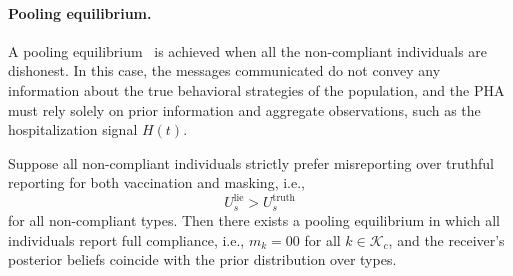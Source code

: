 \documentclass[sigconf,review]{acmart}
\begin{document}

\paragraph{Pooling equilibrium.}


A pooling equilibrium~\cite{HutteggerPNAS2014} is achieved when all the non-compliant individuals are dishonest. In this case, the messages communicated do not convey any information about the true behavioral strategies of the population, and the PHA must rely solely on prior information and aggregate observations, such as the hospitalization signal $H(t)$.

\begin{theorem}
\label{thm:pooling}
Suppose all non-compliant individuals strictly prefer misreporting over truthful reporting for both vaccination and masking, i.e.,
\[
U_s^{\text{lie}} > U_s^{\text{truth}}
\]
for all non-compliant types. Then there exists a pooling equilibrium in which all individuals report full compliance, i.e., $m_k = 00$ for all $k\in\mathcal{K}_c$, and the receiver’s posterior beliefs coincide with the prior distribution over types.
\end{theorem}
\end{document}
